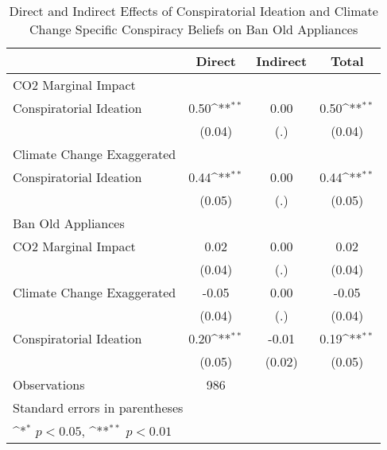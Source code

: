 \begin{table}[htbp]\centering
\def\sym#1{\ifmmode^{#1}\else\(^{#1}\)\fi}
\caption{Direct and Indirect Effects of Conspiratorial Ideation and Climate Change Specific Conspiracy Beliefs on Ban Old Appliances}
\begin{tabular}{l*{3}{c}}
\hline\hline
                    &\multicolumn{1}{c}{Direct}&\multicolumn{1}{c}{Indirect}&\multicolumn{1}{c}{Total}\\
\hline
CO2 Marginal Impact &                    &                    &                    \\
Conspiratorial Ideation&        0.50\sym{**}&        0.00        &        0.50\sym{**}\\
                    &      (0.04)        &         (.)        &      (0.04)        \\
\hline
Climate Change Exaggerated&                    &                    &                    \\
Conspiratorial Ideation&        0.44\sym{**}&        0.00        &        0.44\sym{**}\\
                    &      (0.05)        &         (.)        &      (0.05)        \\
\hline
Ban Old Appliances  &                    &                    &                    \\
CO2 Marginal Impact &        0.02        &        0.00        &        0.02        \\
                    &      (0.04)        &         (.)        &      (0.04)        \\
[1em]
Climate Change Exaggerated&       -0.05        &        0.00        &       -0.05        \\
                    &      (0.04)        &         (.)        &      (0.04)        \\
[1em]
Conspiratorial Ideation&        0.20\sym{**}&       -0.01        &        0.19\sym{**}\\
                    &      (0.05)        &      (0.02)        &      (0.05)        \\
\hline
Observations        &         986        &                    &                    \\
\hline\hline
\multicolumn{4}{l}{\footnotesize Standard errors in parentheses}\\
\multicolumn{4}{l}{\footnotesize \sym{*} \(p<0.05\), \sym{**} \(p<0.01\)}\\
\end{tabular}
\end{table}
